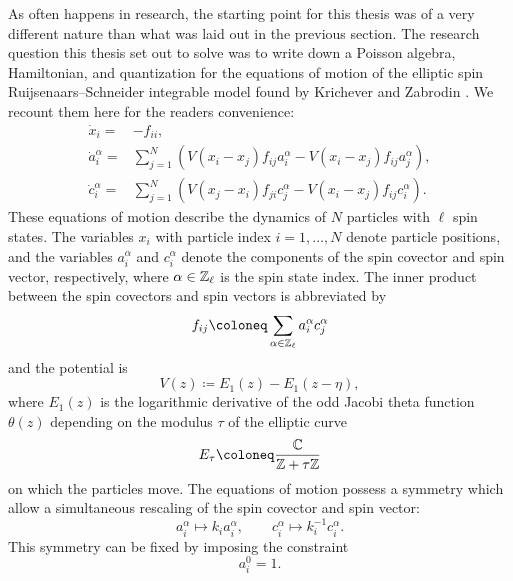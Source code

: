 As often happens in research, the starting point for this thesis was of a very different nature than what was laid out in the previous section. The research question this thesis set out to solve was to write down a Poisson algebra, Hamiltonian, and quantization for the equations of motion of the elliptic spin Ruijsenaars--Schneider integrable model found by Krichever and Zabrodin \cite{krichever_spin_1995}. We recount them here for the readers convenience:
\begin{equation}\label{eq:eoms}
    \begin{aligned}
        \dot x_i
        ={}& {-f_{ii}}, \\[6pt]
        \dot a_i^\alpha
        ={}& \sum_{j=1}^N (V(x_i-x_j) f_{ij} a_i^\alpha - V(x_i-x_j) f_{ij} a_j^\alpha), \\[-1pt]
        \dot c_i^\alpha
        ={}& \sum_{j=1}^N (V(x_j-x_i) f_{ji} c_j^\alpha - V(x_i-x_j) f_{ij} c_i^\alpha).
    \end{aligned}
\end{equation}
These equations of motion describe the dynamics of $N$ particles with $\ell$ spin states. The variables $x_i$ with particle index $i=1,\dots,N$ denote particle positions, and the variables $a_i^\alpha$ and $c_i^\alpha$ denote the components of the spin covector and spin vector, respectively, where $\alpha \in \mathbb{Z}_\ell$ is the spin state index. The inner product between the spin covectors and spin vectors is abbreviated by
\begin{equation}
	f_{ij} \coloneq \sum_{\alpha \in \Z_\ell} a_i^\alpha c_j^\alpha
\end{equation}
and the potential is
\begin{equation}
	V(z) \coloneq E_1(z) - E_1(z-\eta),
\end{equation}
where $E_1(z)$ is the logarithmic derivative of the odd Jacobi theta function $\theta(z)$ depending on the modulus $\tau$ of the elliptic curve
\begin{equation}
	E_\tau \coloneq \frac{\C}{\Z+\tau \Z}
\end{equation}
on which the particles move. The equations of motion possess a symmetry which allow a simultaneous rescaling of the spin covector and spin vector:
\begin{equation}
	a_i^\alpha \mapsto k_i a_i^\alpha, \qquad c_i^\alpha \mapsto k_i^{-1} c_i^\alpha.
\end{equation}
This symmetry can be fixed by imposing the constraint
\begin{equation}
	a_i^0 = 1.
\end{equation}
